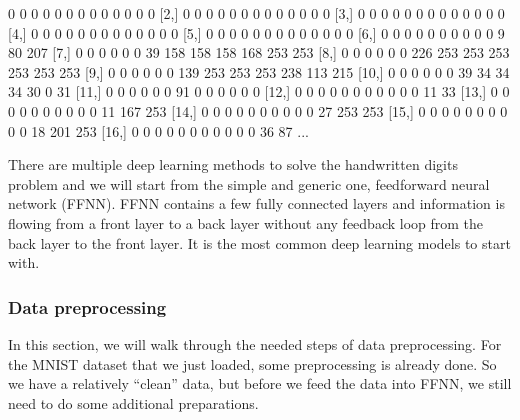 \documentclass[
  12pt,
]{krantz}
\makeatletter
\newenvironment{Shaded}{\begin{snugshade}}{\end{snugshade}}
\newcommand{\NormalTok}[1]{#1}
\newenvironment{kframe}{%
\medskip{}
\setlength{\fboxsep}{.8em}
 \def\at@end@of@kframe{}%
 \ifinner\ifhmode%
  \def\at@end@of@kframe{\end{minipage}}%
  \begin{minipage}{\columnwidth}%
 \fi\fi%
 \def\FrameCommand##1{\hskip\@totalleftmargin \hskip-\fboxsep
 \colorbox{shadecolor}{##1}\hskip-\fboxsep
     \hskip-\linewidth \hskip-\@totalleftmargin \hskip\columnwidth}%
 \MakeFramed {\advance\hsize-\width
   \@totalleftmargin\z@ \linewidth\hsize
   \@setminipage}}%
 {\par\unskip\endMakeFramed%
 \at@end@of@kframe}
\renewenvironment{Shaded}{\begin{kframe}}{\end{kframe}}
\makeatother
\begin{document}
\begin{Shaded}
\begin{Highlighting}[]
\NormalTok{     [,1] [,2] [,3] [,4] [,5] [,6] [,7] [,8] [,9] [,10] [,11] [,12] [,13]}
\NormalTok{ [1,]    0    0    0    0    0    0    0    0    0     0     0     0     0}
\NormalTok{ [2,]    0    0    0    0    0    0    0    0    0     0     0     0     0}
\NormalTok{ [3,]    0    0    0    0    0    0    0    0    0     0     0     0     0}
\NormalTok{ [4,]    0    0    0    0    0    0    0    0    0     0     0     0     0}
\NormalTok{ [5,]    0    0    0    0    0    0    0    0    0     0     0     0     0}
\NormalTok{ [6,]    0    0    0    0    0    0    0    0    0     0     9    80   207}
\NormalTok{ [7,]    0    0    0    0    0    0   39  158  158   158   168   253   253}
\NormalTok{ [8,]    0    0    0    0    0    0  226  253  253   253   253   253   253}
\NormalTok{ [9,]    0    0    0    0    0    0  139  253  253   253   238   113   215}
\NormalTok{[10,]    0    0    0    0    0    0   39   34   34    34    30     0    31}
\NormalTok{[11,]    0    0    0    0    0    0   91    0    0     0     0     0     0}
\NormalTok{[12,]    0    0    0    0    0    0    0    0    0     0     0    11    33}
\NormalTok{[13,]    0    0    0    0    0    0    0    0    0     0    11   167   253}
\NormalTok{[14,]    0    0    0    0    0    0    0    0    0     0    27   253   253}
\NormalTok{[15,]    0    0    0    0    0    0    0    0    0     0    18   201   253}
\NormalTok{[16,]    0    0    0    0    0    0    0    0    0     0     0    36    87}
\NormalTok{...}
\end{Highlighting}
\end{Shaded}

There are multiple deep learning methods to solve the handwritten digits problem and we will start from the simple and generic one, feedforward neural network (FFNN). FFNN contains a few fully connected layers and information is flowing from a front layer to a back layer without any feedback loop from the back layer to the front layer. It is the most common deep learning models to start with.

\hypertarget{data-preprocessing}{%
\subsubsection{Data preprocessing}\label{data-preprocessing}}

In this section, we will walk through the needed steps of data preprocessing. For the MNIST dataset that we just loaded, some preprocessing is already done. So we have a relatively ``clean'' data, but before we feed the data into FFNN, we still need to do some additional preparations.
\end{document}
